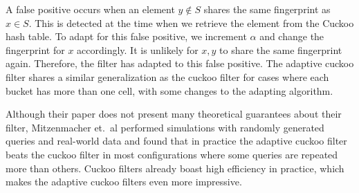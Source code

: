 \documentclass[../paper.tex]{subfiles}
\begin{document}
A false positive occurs when an element $y\not\in S$ shares the same fingerprint as $x\in S$. This is detected at the time when we retrieve the element from the
Cuckoo hash table. To adapt for this false positive, we increment $\alpha$ and change the fingerprint for $x$ accordingly. It is unlikely for $x,y$ to share the same fingerprint again.
Therefore, the filter has adapted to this false positive. The adaptive cuckoo filter shares a similar generalization as the cuckoo filter for cases where each bucket has more than one cell, with some changes to the adapting algorithm.

Although their paper does not present many theoretical guarantees about their filter, Mitzenmacher et.\ al performed simulations with randomly generated queries and real-world data and found that in practice the adaptive cuckoo filter beats the cuckoo filter in most configurations where some queries are repeated more than others. Cuckoo filters already boast high efficiency in practice, which makes the adaptive cuckoo filters even more impressive.

\end{document}
